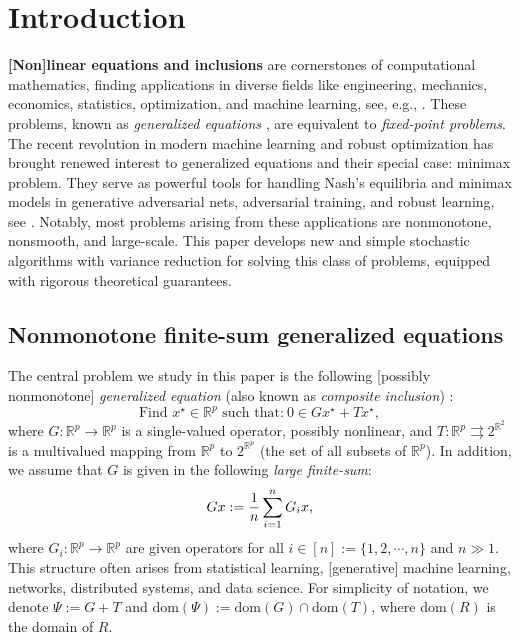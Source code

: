 \documentclass{article}
\newcommand{\R}{\mathbb{R}}
\newcommand{\sets}[1]{\{#1\}}
\newcommand{\dom}[1]{\mathrm{dom}(#1)}
\newcommand{\beforesec}{\vspace{-1.5ex}}
\newcommand{\aftersec}{\vspace{-1.25ex}}
\newcommand{\beforesubsec}{\vspace{-1.5ex}}
\newcommand{\aftersubsec}{\vspace{-1.5ex}}
\theoremstyle{plain}
\theoremstyle{definition}
\theoremstyle{remark}
\begin{document}
\vspace{-2ex}
\beforesec
\section{Introduction}\label{sec:intro}
\aftersec
\textbf{[Non]linear equations and inclusions}  are cornerstones of computational mathematics, finding applications in diverse fields like engineering, mechanics, economics, statistics, optimization, and machine learning, see, e.g., \cite{Bauschke2011,reginaset2008,Facchinei2003,phelps2009convex,ryu2022large,ryu2016primer}.
These problems, known as \textit{generalized equations} \citep{Rockafellar1997}, are equivalent to \textit{fixed-point problems}.
The recent revolution in modern machine learning and robust optimization has brought renewed interest to generalized equations and their special case: minimax problem. 
They serve as powerful tools for handling Nash's equilibria and minimax models in generative adversarial nets, adversarial training, and robust learning,  
see \cite{arjovsky2017wasserstein,goodfellow2014generative,madry2018towards,namkoong2016stochastic}.
Notably, most problems arising from these applications are nonmonotone, nonsmooth, and large-scale.
This paper develops new and simple stochastic algorithms with variance reduction for solving this class of problems, equipped with rigorous theoretical guarantees.

\beforesubsec
\subsection{Nonmonotone finite-sum generalized equations}\label{subsec:problem_statements}
\aftersubsec
The central problem we study in this paper is the following [possibly nonmonotone] \textit{generalized equation} (also known as \textit{composite inclusion}) \citep{Rockafellar1997}:
\begin{equation}\label{eq:NI}
\textrm{Find $x^{\star} \in \R^p$ such that:}~ 0 \in  Gx^{\star} + Tx^{\star},
\tag{NI}
\end{equation}
where $G : \R^p \to \R^p$ is a single-valued operator, possibly nonlinear, and $T : \R^p \rightrightarrows 2^{\R^2}$ is a multivalued mapping from $\R^p$ to $2^{\R^p}$ (the set of all subsets of $\R^p$).
In addition,  we assume that $G$ is given in the following \textit{large finite-sum}:{\!\!\!}
\vspace{-1ex}
\begin{equation}\label{eq:finite_sum_form}
Gx := \frac{1}{n}\sum_{i=1}^nG_ix,
\vspace{-0.5ex}
\end{equation}
where $G_i : \R^p\to\R^p$ are given operators for all $i \in [n] := \sets{1, 2, \cdots, n}$ and $n \gg 1$.
This structure often arises from statistical learning, [generative] machine learning, networks, distributed systems, and data science.
For simplicity of notation, we denote $\Psi := G + T$ and $\dom{\Psi} := \dom{G}\cap\dom{T}$, where $\dom{R}$ is the domain of $R$.
\end{document}
